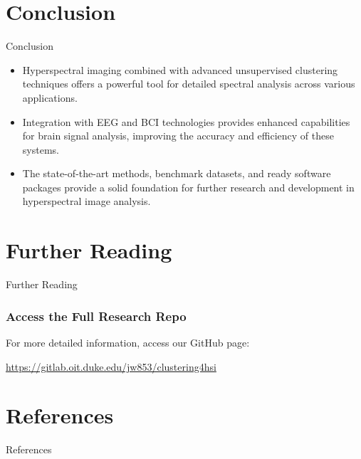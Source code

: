 \documentclass[10pt,svgnames,fragile]{beamer}
\begin{document}
\section{Conclusion}
\begin{frame}{Conclusion}
    \small
    \begin{itemize}
        \item Hyperspectral imaging combined with advanced unsupervised clustering techniques offers a powerful tool for detailed spectral analysis across various applications.
        \item Integration with EEG and BCI technologies provides enhanced capabilities for brain signal analysis, improving the accuracy and efficiency of these systems.
        \item The state-of-the-art methods, benchmark datasets, and ready software packages provide a solid foundation for further research and development in hyperspectral image analysis.
    \end{itemize}
\end{frame}

\section{Further Reading}
\begin{frame}{Further Reading}
    \frametitle{Access the Full Research Repo}
    For more detailed information, access our GitHub page:
    
    \vspace{1em} %
    \href{https://gitlab.oit.duke.edu/jw853/clustering4hsi}{https://gitlab.oit.duke.edu/jw853/clustering4hsi}
\end{frame}

\section{References}
\begin{frame}[allowframebreaks]{References}
\small


\end{frame}
\end{document}
